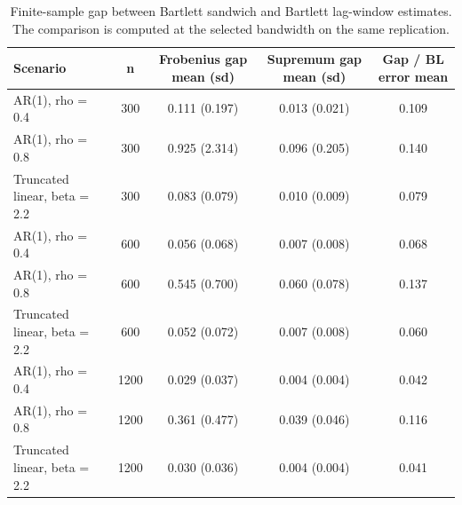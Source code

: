 \begin{table}[!htbp]
\small
\centering
\caption{Finite-sample gap between Bartlett sandwich and Bartlett lag-window estimates. The comparison is computed at the selected bandwidth on the same replication.}
\label{tab:bs-bl-gap}
\begin{tabular}{lcccc}
\toprule
Scenario & n & Frobenius gap mean (sd) & Supremum gap mean (sd) & Gap / BL error mean \\
\midrule
AR(1), rho = 0.4 & 300 & 0.111 (0.197) & 0.013 (0.021) & 0.109 \\
AR(1), rho = 0.8 & 300 & 0.925 (2.314) & 0.096 (0.205) & 0.140 \\
Truncated linear, beta = 2.2 & 300 & 0.083 (0.079) & 0.010 (0.009) & 0.079 \\
AR(1), rho = 0.4 & 600 & 0.056 (0.068) & 0.007 (0.008) & 0.068 \\
AR(1), rho = 0.8 & 600 & 0.545 (0.700) & 0.060 (0.078) & 0.137 \\
Truncated linear, beta = 2.2 & 600 & 0.052 (0.072) & 0.007 (0.008) & 0.060 \\
AR(1), rho = 0.4 & 1200 & 0.029 (0.037) & 0.004 (0.004) & 0.042 \\
AR(1), rho = 0.8 & 1200 & 0.361 (0.477) & 0.039 (0.046) & 0.116 \\
Truncated linear, beta = 2.2 & 1200 & 0.030 (0.036) & 0.004 (0.004) & 0.041 \\
\bottomrule
\end{tabular}
\end{table}
